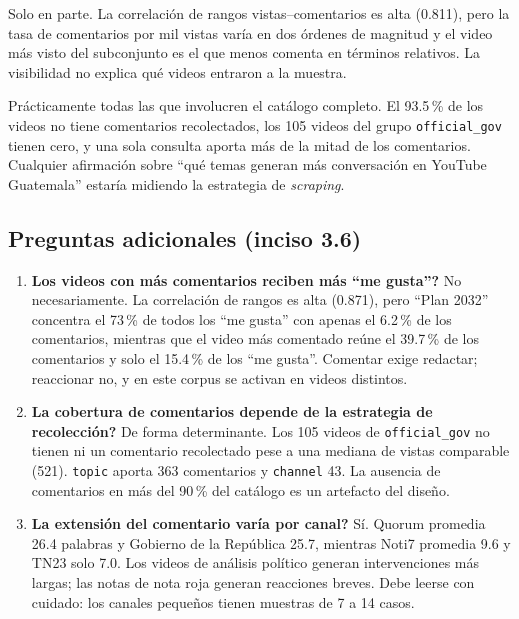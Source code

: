 \documentclass[11pt,a4paper]{article}
\begin{document}
\begin{description}[leftmargin=0em,style=unboxed,itemsep=3pt]
\item[\textnormal{\itshape \textquestiondown{}La visibilidad coincide con la participaci\'on?}]
Solo en parte. La correlaci\'on de rangos vistas--comentarios es alta (0.811), pero la tasa de
comentarios por mil vistas var\'ia en dos \'ordenes de magnitud y el video m\'as visto del subconjunto
es el que menos comenta en t\'erminos relativos. La visibilidad no explica qu\'e videos entraron a la
muestra.

\item[\textnormal{\itshape \textquestiondown{}Qu\'e conclusiones quedan limitadas por la recolecci\'on?}]
Pr\'acticamente todas las que involucren el cat\'alogo completo. El 93.5\,\% de los videos no tiene
comentarios recolectados, los 105 videos del grupo \texttt{official\_gov} tienen cero, y una sola
consulta aporta m\'as de la mitad de los comentarios. Cualquier afirmaci\'on sobre ``qu\'e temas
generan m\'as conversaci\'on en YouTube Guatemala'' estar\'ia midiendo la estrategia de \emph{scraping}.
\end{description}

\subsection{Preguntas adicionales (inciso 3.6)}
\begin{enumerate}[leftmargin=1.4em,itemsep=3pt]
\item \textbf{\textquestiondown{}Los videos con m\'as comentarios reciben m\'as ``me gusta''?} No necesariamente. La
correlaci\'on de rangos es alta (0.871), pero ``Plan 2032'' concentra el 73\,\% de todos los ``me
gusta'' con apenas el 6.2\,\% de los comentarios, mientras que el video m\'as comentado re\'une el
39.7\,\% de los comentarios y solo el 15.4\,\% de los ``me gusta''. Comentar exige redactar; reaccionar
no, y en este corpus se activan en videos distintos.
\item \textbf{\textquestiondown{}La cobertura de comentarios depende de la estrategia de recolecci\'on?} De forma
determinante. Los 105 videos de \texttt{official\_gov} no tienen ni un comentario recolectado pese a
una mediana de vistas comparable (521). \texttt{topic} aporta 363 comentarios y \texttt{channel} 43.
La ausencia de comentarios en m\'as del 90\,\% del cat\'alogo es un artefacto del dise\~no.
\item \textbf{\textquestiondown{}La extensi\'on del comentario var\'ia por canal?} S\'i. Quorum promedia 26.4 palabras
y Gobierno de la Rep\'ublica 25.7, mientras Noti7 promedia 9.6 y TN23 solo 7.0. Los videos de an\'alisis
pol\'itico generan intervenciones m\'as largas; las notas de nota roja generan reacciones breves. Debe
leerse con cuidado: los canales peque\~nos tienen muestras de 7 a 14 casos.
\end{enumerate}
\end{document}
